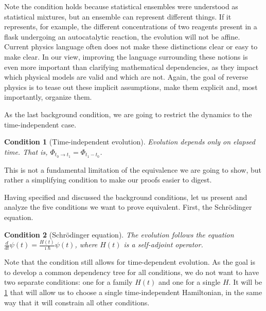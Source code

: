 \documentclass[entropy,article,submit,moreauthors]{Definitions/mdpi}
\newtheorem{condth}{Condition}
\renewcommand*{\thecondth}{\Roman{condth}}
\newenvironment{condition}[2][]{\renewcommand{\thecondth}{#2}\begin{condth}[#1]\label{#2}}{\end{condth}\renewcommand{\thecondth}{\Roman{condth}}}
\begin{document}
Note the condition holds because statistical ensembles were understood as statistical mixtures, but an ensemble can represent different things. If it represents, for example, the different concentrations of two reagents present in a flask undergoing an autocatalytic reaction, the evolution will not be affine. Current physics language often does not make these distinctions clear or easy to make clear. In our view, improving the language surrounding these notions is even more important than clarifying mathematical dependencies, as they impact which physical models are valid and which are not. Again, the goal of reverse physics is to tease out these implicit assumptions, make them explicit and, most importantly, organize them.

As the last background condition, we are going to restrict the dynamics to the time-independent case.
\begin{condition}[Time-independent evolution]{EVTI}
	Evolution depends only on elapsed time. That is, $\Phi_{t_0 \to t_1}=\Phi_{t_1-t_0}$.
\end{condition}
This is not a fundamental limitation of the equivalence we are going to show, but rather a simplifying condition to make our proofs easier to digest.

Having specified and discussed the background conditions, let us present and analyze the five conditions we want to prove equivalent. First, the Schrödinger equation.
\begin{condition}[Schrödinger equation]{DR-SCEQ}
	The evolution follows the equation $\frac{d}{dt} \psi(t) = \frac{H(t)}{\imath \hbar} \psi(t)$, where $H(t)$ is a self-adjoint operator.
\end{condition}
Note that the condition still allows for time-dependent evolution. As the goal is to develop a common dependency tree for all conditions, we do not want to have two separate conditions: one for a family $H(t)$ and one for a single $H$. It will be \ref{EVTI} that will allow us to choose a single time-independent Hamiltonian, in the same way that it will constrain all other conditions.
\end{document}
